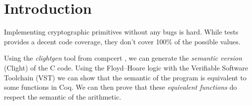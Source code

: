 \section{Introduction}

Implementing cryptographic primitives without any bugs is hard. While tests
provides a decent code coverage, they don't cover 100\% of the possible values.

Using the \textit{clightgen} tool from compcert \cite{Leroy-backend}, we can
generate the \textit{semantic version} (Clight\cite{Blazy-Leroy-Clight-09}) of
the C code. Using the Floyd–Hoare logic\cite{1969-Hoare} with the Verifiable
Software Toolchain (VST)\cite{2012-Appel} we can show that the semantic of the
program is equivalent to some functions in Coq. We can then prove that these
\textit{equivalent functions} do respect the semantic of the arithmetic.
